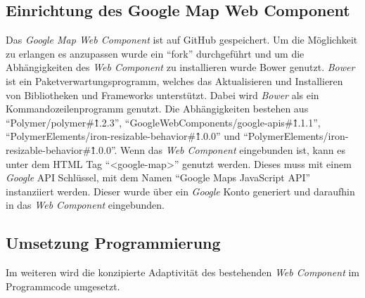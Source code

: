 \documentclass[12pt, paper=a4, bibtotoc, toc=listof, headsepline=true]{scrreprt}
\begin{document}
			\subsection{Einrichtung des Google Map Web Component}
			Das \emph{Google Map Web Component} ist auf GitHub gespeichert. Um die Möglichkeit zu erlangen es anzupassen wurde ein \enquote{fork} durchgeführt und um die Abhängigkeiten des \emph{Web Component} zu installieren wurde Bower genutzt. \emph{Bower} ist ein Paketverwartungsprogramm, welches das Aktualisieren und Installieren von Bibliotheken und Frameworks unterstützt. Dabei wird \emph{Bower} als ein Kommandozeilenprogramm genutzt.\cite[vgl.]{bower} Die Abhängigkeiten bestehen aus \enquote{Polymer/polymer\#\^1.2.3}, \enquote{GoogleWebComponents/google-apis\#\^1.1.1}, \enquote{PolymerElements/iron-resizable-behavior\#\^1.0.0} und \enquote{PolymerElements/iron-resizable-behavior\#\^1.0.0}.
			Wenn das \emph{Web Component} eingebunden ist, kann es unter dem \ac{HTML} Tag \enquote{<google-map>} genutzt werden. Dieses muss mit einem \emph{Google} \ac{API} Schlüssel, mit dem Namen \enquote{Google Maps JavaScript API} instanziiert werden. Dieser wurde über ein \emph{Google} Konto generiert und daraufhin in das \emph{Web Component} eingebunden. 
			\subsection{Umsetzung Programmierung}
			Im weiteren wird die konzipierte Adaptivität des bestehenden \emph{Web Component} im Programmcode umgesetzt.
\end{document}

